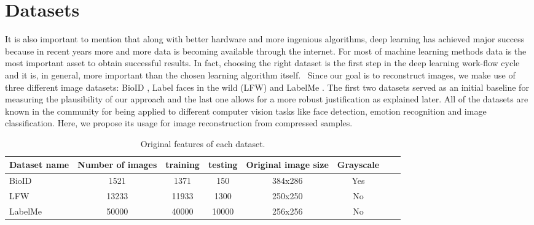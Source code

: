 \FloatBarrier

\section{Datasets}
It is also important to mention that along with better hardware and more ingenious algorithms, deep learning has achieved major success because in recent years more and more data is becoming available through the internet. For most of machine learning methods data is the most important asset to obtain successful results. In fact, choosing the right dataset is the first step in the deep learning work-flow cycle and it is, in general, more important than the chosen learning algorithm itself. \
Since our goal is to reconstruct images, we make use of three different image datasets: BioID \cite{frischholz2003bioid}, Label faces in the wild (LFW) \cite{LFWTech} and LabelMe \cite{russell2008labelme}. The first two datasets served as an initial baseline for measuring the plausibility of our approach and the last one allows for a more robust justification as explained later. All of the datasets are known in the community for being applied to different computer vision tasks like face detection, emotion recognition and image classification. Here, we propose its usage for image reconstruction from compressed samples. 
\begin{table}[!htb]
\caption[Datasets for training and testing]{Original features of each dataset.}
\label{tab:datasets1}
\centering
\begin{tabular}{l*{6}{c}r}
Dataset name              & Number of images & training & testing &  Original image size& Grayscale \\
\hline
BioID   & 1521 & 1371 & 150 & 384x286 & Yes\\
LFW     & 13233 & 11933 & 1300 & 250x250 & No\\
LabelMe & 50000 & 40000 & 10000 & 256x256 & No\\
\bottomrule 
\end{tabular}  
\end{table}

